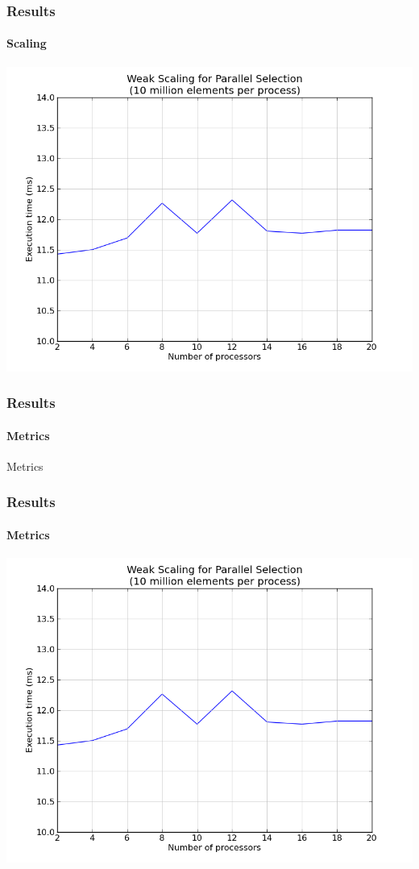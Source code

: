 \documentclass{beamer}
\begin{document}
\begin{frame}
  \frametitle{Results}
  \framesubtitle{Scaling}
  \begin{center}
    \includegraphics[width=.8\textwidth]{weak.png}
  \end{center}
\end{frame}

\begin{frame}
  \frametitle{Results}
  \framesubtitle{Metrics}
  \begin{block}{Metrics}
    \vspace{1cm}
    \hspace{0.5cm}{\Huge $x5$ per character changed.} \\
    \hspace{0.5cm}{\Huge $x2$ per second spent.}
    \vspace{1cm}
  \end{block}
\end{frame}

\begin{frame}
  \frametitle{Results}
  \framesubtitle{Metrics}
  \begin{center}
    \includegraphics[width=.8\textwidth]{weak.png}
  \end{center}
\end{frame}
\end{document}
